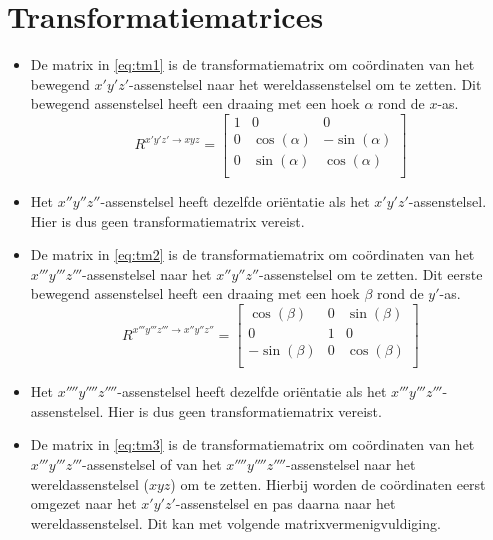 \section{Transformatiematrices}
\begin{itemize}
\item De matrix in \eqref{eq:tm1} is de transformatiematrix om coördinaten van het bewegend $x'y'z'$-assenstelsel naar het wereldassenstelsel om te zetten. Dit bewegend assenstelsel heeft een draaing met een hoek $\alpha$ rond de $x$-as.
\begin{equation}
R^{x'y'z' \rightarrow xyz}=
\begin{bmatrix}
1			&			0			&			0		   \\
0			&\cos(\alpha)&-\sin(\alpha)\\
0			&\sin(\alpha)&\cos(\alpha) \\
\end{bmatrix}
\label{eq:tm1}
\end{equation}
\item Het $x''y''z''$-assenstelsel heeft dezelfde oriëntatie als het $x'y'z'$-assenstelsel. Hier is dus geen transformatiematrix vereist.
\item De matrix in \eqref{eq:tm2} is de transformatiematrix om coördinaten van het $x'''y'''z'''$-assenstelsel naar het $x''y''z''$-assenstelsel om te zetten. Dit eerste bewegend assenstelsel heeft een draaing met een hoek $\beta$ rond de $y'$-as.
\begin{equation}
R^{x'''y'''z''' \rightarrow x''y''z''}=
\begin{bmatrix}
\cos(\beta)	&			0			&\sin(\beta)\\
0						&			1			&			0		 \\
-\sin(\beta)&			0			&\cos(\beta)\\
\end{bmatrix}
\label{eq:tm2}
\end{equation}
\item Het $x''''y''''z''''$-assenstelsel heeft dezelfde oriëntatie als het $x'''y'''z'''$-assenstelsel. Hier is dus geen transformatiematrix vereist.
\item De matrix in \eqref{eq:tm3} is de transformatiematrix om coördinaten van het $x'''y'''z'''$-assenstelsel of van het $x''''y''''z''''$-assenstelsel naar het wereldassenstelsel ($xyz$) om te zetten. Hierbij worden de coördinaten eerst omgezet naar het $x'y'z'$-assenstelsel en pas daarna naar het wereldassenstelsel. Dit kan met volgende matrixvermenigvuldiging.
\begin{equation}

\end{equation}
\end{itemize}
